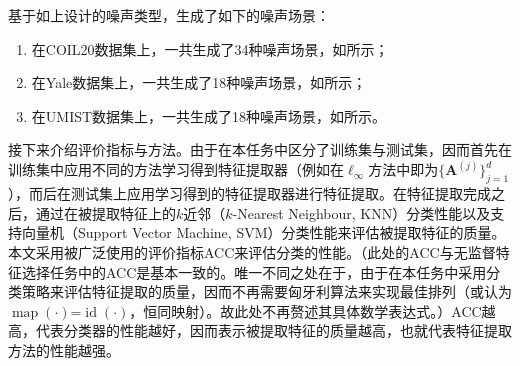 基于如上设计的噪声类型，生成了如下的噪声场景：
\begin{enumerate}
    \item 在COIL20数据集上，一共生成了34种噪声场景，如所示；
    \item 在Yale数据集上，一共生成了18种噪声场景，如所示；
    \item 在UMIST数据集上，一共生成了18种噪声场景，如所示。
\end{enumerate}

接下来介绍评价指标与方法。由于在本任务中区分了训练集与测试集，因而首先在训练集中应用不同的方法学习得到特征提取器（例如在$\ell_{\infty}$方法中即为$\{\boldsymbol{A}^{(j)}\}_{j=1}^{d}$），而后在测试集上应用学习得到的特征提取器进行特征提取。在特征提取完成之后，通过在被提取特征上的$k$近邻（$k$-Nearest Neighbour, KNN）分类性能以及支持向量机（Support Vector Machine, SVM）分类性能来评估被提取特征的质量。本文采用被广泛使用的评价指标ACC来评估分类的性能。（此处的ACC与无监督特征选择任务中的ACC是基本一致的。唯一不同之处在于，由于在本任务中采用分类策略来评估特征提取的质量，因而不再需要匈牙利算法来实现最佳排列（或认为$\operatorname{map}(\cdot)$=$\operatorname{id}(\cdot)$，恒同映射）。故此处不再赘述其具体数学表达式。）ACC越高，代表分类器的性能越好，因而表示被提取特征的质量越高，也就代表特征提取方法的性能越强。

